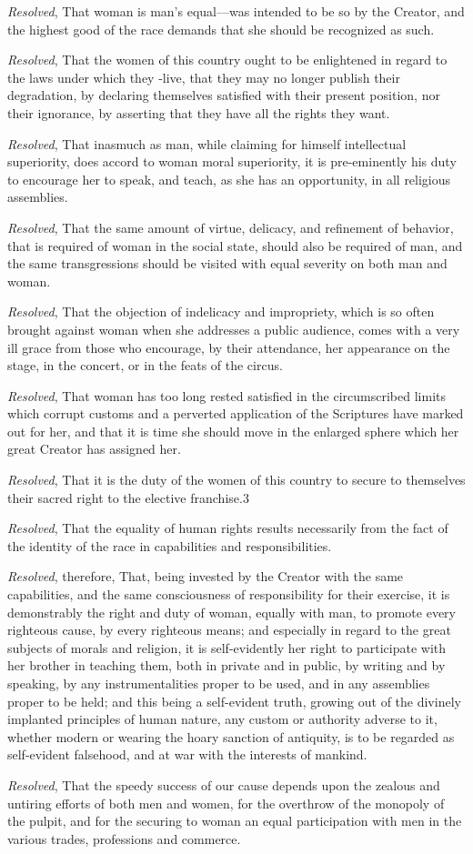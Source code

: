 \documentclass{article}
\begin{document}
\textit{Resolved}, That woman is man's equal—was intended to be so by the
Creator, and the highest good of the race demands that she should be recognized
as such.

\textit{Resolved}, That the women of this country ought to be enlightened in
regard to the laws under which they -live, that they may no longer publish
their degradation, by declaring themselves satisfied with their present
position, nor their ignorance, by asserting that they have all the rights they
want.

\textit{Resolved}, That inasmuch as man, while claiming for himself
intellectual superiority, does accord to woman moral superiority, it is
pre-eminently his duty to encourage her to speak, and teach, as she has an
opportunity, in all religious assemblies.

\textit{Resolved}, That the same amount of virtue, delicacy, and refinement of
behavior, that is required of woman in the social state, should also be
required of man, and the same transgressions should be visited with equal
severity on both man and woman.

\textit{Resolved}, That the objection of indelicacy and impropriety, which is
so often brought against woman when she addresses a public audience, comes with
a very ill grace from those who encourage, by their attendance, her appearance
on the stage, in the concert, or in the feats of the circus.

\textit{Resolved}, That woman has too long rested satisfied in the
circumscribed limits which corrupt customs and a perverted application of the
Scriptures have marked out for her, and that it is time she should move in the
enlarged sphere which her great Creator has assigned her.

\textit{Resolved}, That it is the duty of the women of this country to secure
to themselves their sacred right to the elective franchise.3

\textit{Resolved}, That the equality of human rights results necessarily from
the fact of the identity of the race in capabilities and responsibilities.

\textit{Resolved}, therefore, That, being invested by the Creator with the same
capabilities, and the same consciousness of responsibility for their exercise,
it is demonstrably the right and duty of woman, equally with man, to promote
every righteous cause, by every righteous means; and especially in regard to
the great subjects of morals and religion, it is self-evidently her right to
participate with her brother in teaching them, both in private and in public,
by writing and by speaking, by any instrumentalities proper to be used, and in
any assemblies proper to be held; and this being a self-evident truth, growing
out of the divinely implanted principles of human nature, any custom or
authority adverse to it, whether modern or wearing the hoary sanction of
antiquity, is to be regarded as self-evident falsehood, and at war with the
interests of mankind. 

\textit{Resolved}, That the speedy success of our cause depends upon the
zealous and untiring efforts of both men and women, for the overthrow of the
monopoly of the pulpit, and for the securing to woman an equal participation
with men in the various trades, professions and commerce.
\end{document}
